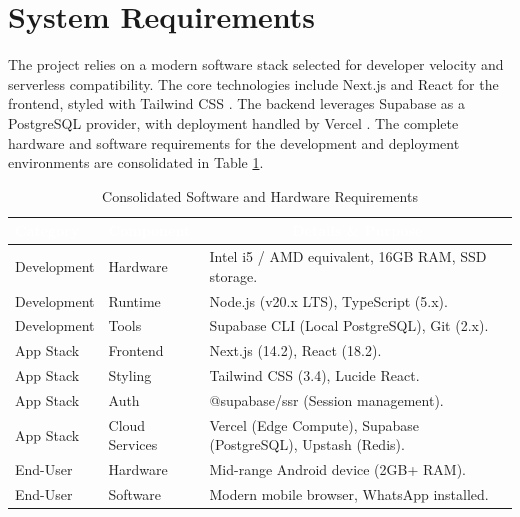 \documentclass[12pt, a4paper, oneside]{report}
\begin{document}
\section{System Requirements}
The project relies on a modern software stack selected for developer velocity and serverless compatibility. The core technologies include Next.js \cite{nextjs_docs} and React \cite{react_docs} for the frontend, styled with Tailwind CSS \cite{tailwind_docs}. The backend leverages Supabase \cite{supabase_docs} as a PostgreSQL \cite{postgres_docs} provider, with deployment handled by Vercel \cite{vercel_docs}. The complete hardware and software requirements for the development and deployment environments are consolidated in Table \ref{tab:requirements}.

\begin{table}[htbp]
    \centering
    \caption{Consolidated Software and Hardware Requirements}
    \label{tab:requirements}
    \renewcommand{\arraystretch}{1.5}
    \begin{tabularx}{\textwidth}{l l X}
    \toprule
    \rowcolor{brandteal}
    \textcolor{white}{\textbf{Category}} & \textcolor{white}{\textbf{Component}} & \multicolumn{1}{c}{\textcolor{white}{\textbf{Details \& Purpose}}} \\
    \midrule
    \rowcolor{lightgray!30}
    Development & Hardware & Intel i5 / AMD equivalent, 16GB RAM, SSD storage. \\
    Development & Runtime & Node.js (v20.x LTS), TypeScript (5.x). \\
    \rowcolor{lightgray!30}
    Development & Tools & Supabase CLI (Local PostgreSQL), Git (2.x). \\
    App Stack & Frontend & Next.js (14.2), React (18.2). \\
    \rowcolor{lightgray!30}
    App Stack & Styling & Tailwind CSS (3.4), Lucide React. \\
    App Stack & Auth & @supabase/ssr (Session management). \\
    \rowcolor{lightgray!30}
    App Stack & Cloud Services & Vercel (Edge Compute), Supabase (PostgreSQL), Upstash (Redis). \\
    End-User & Hardware & Mid-range Android device (2GB+ RAM). \\
    \rowcolor{lightgray!30}
    End-User & Software & Modern mobile browser, WhatsApp installed. \\
    \bottomrule
    \end{tabularx}
\end{table}
\end{document}
